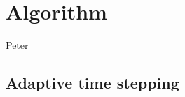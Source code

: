 \chapter{Algorithm} %
\label{cha:algorithm}

Peter

\section{Adaptive time stepping} %
\label{sec:adaptive_time_stepping}


